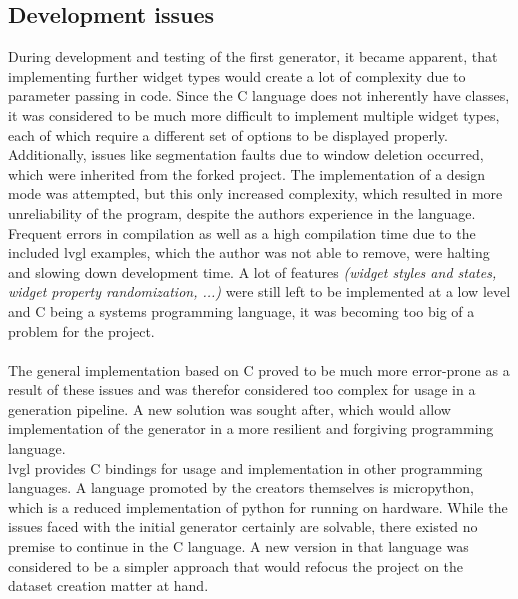 \documentclass[Bachelor, BIC, english, fhCitStyle, IEEE]{BASE/twbook} %
\begin{document}
\subsection{Development issues}
During development and testing of the first generator, it became apparent, that implementing further widget types would create a lot of complexity due to parameter passing in code. Since the C language does not inherently have classes, it was considered to be much more difficult to implement multiple widget types, each of which require a different set of options to be displayed properly.\\
Additionally, issues like segmentation faults due to window deletion occurred, which were inherited from the forked project. The implementation of a design mode was attempted, but this only increased complexity, which resulted in more unreliability of the program, despite the authors experience in the language. Frequent errors in compilation as well as a high compilation time due to the included \ac{lvgl} examples, which the author was not able to remove, were halting and slowing down development time. A lot of features \textit{(widget styles and states, widget property randomization, ...)} were still left to be implemented at a low level and C being a systems programming language, it was becoming too big of a problem for the project.\\\\
The general implementation based on C proved to be much more error-prone as a result of these issues and was therefor considered too complex for usage in a generation pipeline. A new solution was sought after, which would allow implementation of the generator in a more resilient and forgiving programming language.\\
\ac{lvgl} provides C bindings for usage and implementation in other programming languages. A language promoted by the creators themselves is micropython, which is a reduced implementation of python for running on hardware. While the issues faced with the initial generator certainly are solvable, there existed no premise to continue in the C language. A new version in that language was considered to be a simpler approach that would refocus the project on the dataset creation matter at hand.
\clearpage
\end{document}
